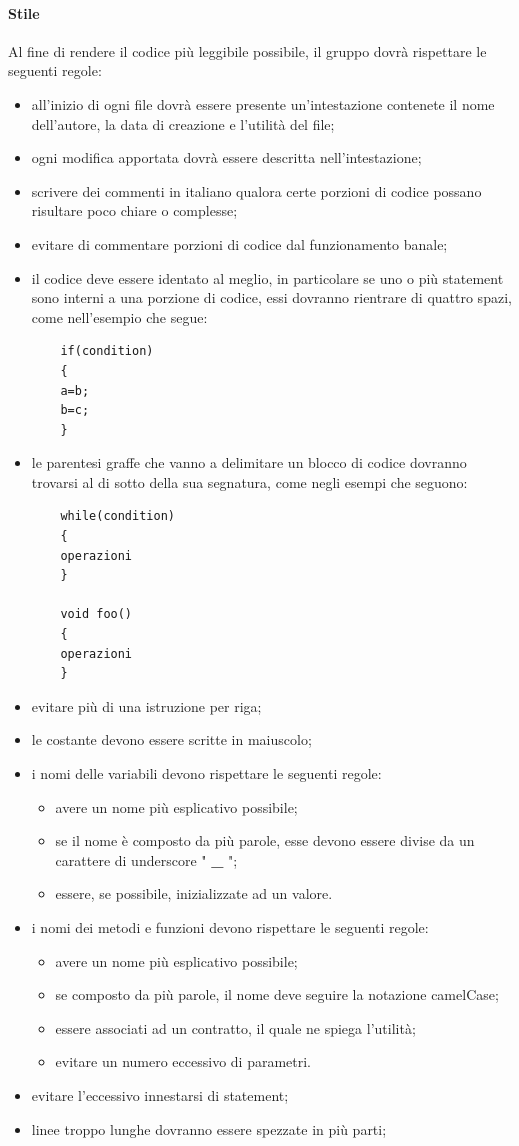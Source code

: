  \paragraph{Stile}
 Al fine di rendere il codice più leggibile possibile, il gruppo dovrà rispettare le seguenti regole:
 \begin{itemize}
 	\item all'inizio di ogni file dovrà essere presente un'intestazione contenete il nome dell'autore, la data di creazione e l'utilità del file;
 	\item ogni modifica apportata dovrà essere descritta nell'intestazione;
 	\item scrivere dei commenti in italiano qualora certe porzioni di codice possano risultare poco chiare o complesse;
 	\item evitare di commentare porzioni di codice dal funzionamento banale;
 	\item il codice deve essere identato al meglio, in particolare se uno o più statement sono interni a una porzione di codice, essi dovranno rientrare di quattro spazi, come nell'esempio che segue: \begin{verbatim}
 	if(condition)
 	{
 	a=b;
 	b=c;
 	}
 	\end{verbatim}
 	\item le parentesi graffe che vanno a delimitare un blocco di codice dovranno trovarsi al di sotto della sua segnatura, come negli esempi che seguono:
 	\begin{verbatim}
 	while(condition)
 	{
 	operazioni
 	}
 	
 	void foo()
 	{
 	operazioni
 	}
 	\end{verbatim}
 	\item evitare più di una istruzione per riga;
 	\item le costante devono essere scritte in maiuscolo;
 	\item i nomi delle variabili devono rispettare le seguenti regole:
 	\begin{itemize}
 		\item avere un nome più esplicativo possibile;
 		\item se il nome è composto da più parole, esse devono essere divise da un carattere di underscore " \textbf{\_} ";
 		\item essere, se possibile, inizializzate ad un valore.
 	\end{itemize}
 	\item i nomi dei metodi e funzioni devono rispettare le seguenti regole:
 	\begin{itemize}
 		\item avere un nome più esplicativo possibile;
 		\item se composto da più parole, il nome deve seguire la notazione camelCase;
 		\item essere associati ad un contratto, il quale ne spiega l'utilità;
 		\item evitare un numero eccessivo di parametri.
 	\end{itemize}
 	\item evitare l'eccessivo innestarsi di statement;
 	\item linee troppo lunghe dovranno essere spezzate in più parti;
 \end{itemize}
